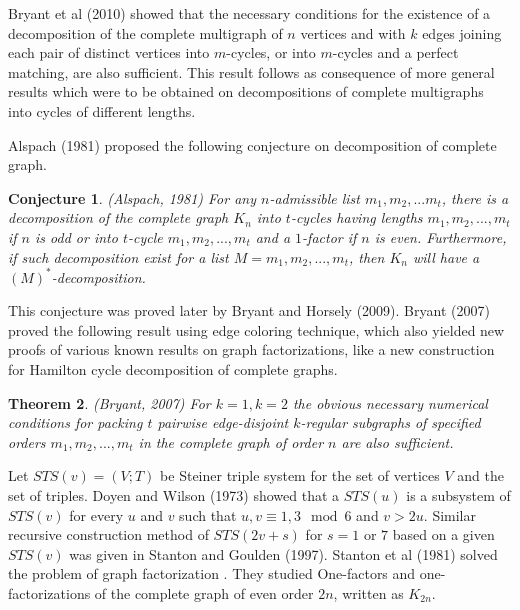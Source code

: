 \documentclass[12pt]{report}
\newtheorem{thm}{Theorem}[section]
\newtheorem{conj}[thm]{Conjecture}
\begin{document}
Bryant et al    (2010) %
showed that the necessary conditions for the existence of a
decomposition of the complete multigraph of $n$ vertices and with
$k$ edges joining each pair of distinct vertices into $m$-cycles, or
into $m$-cycles and a perfect matching, are also sufficient. This
result follows as consequence of more general results which were to
be obtained on decompositions of complete multigraphs into cycles of
different lengths.

Alspach (1981) %
  proposed the following conjecture on decomposition of complete graph.
\begin{conj} (Alspach, 1981) For any $n$-admissible list $m_1,m_2,...m_t$, there is a decomposition of the complete graph $K_n$ into $t$-cycles having lengths $m_1,m_2,...,m_t$ if $n$ is odd or into $t$-cycle $m_1,m_2,...,m_t$ and a $1$-factor if $n$ is even. Furthermore, if such decomposition exist for a list $M=m_1,m_2,...,m_t$, then $K_n$ will have a $(M)^*$-decomposition.
\end{conj}
This conjecture was proved later by Bryant and Horsely (2009).
Bryant (2007) %
proved the following result using edge coloring technique, which
also yielded new proofs of various known results on graph
factorizations, like a new construction for Hamilton cycle
decomposition of complete graphs.
\begin{thm} (Bryant, 2007)
For $k=1,k=2$ the obvious necessary numerical conditions for packing
$t$ pairwise edge-disjoint $k$-regular subgraphs of specified orders
$m_1,m_2,...,m_t$ in the complete graph of order $n$ are also
sufficient.
\end{thm}

Let $STS(v)=(V; T)$ be Steiner triple system  for the set of
vertices $V$ and the set of triples. Doyen and Wilson (1973) showed
that a $STS(u)$ is a subsystem of $STS(v)$ for every $u$ and $v$
such that $u,v \equiv 1,3 \mod 6$ and $v > 2u$. Similar recursive
construction method of $STS(2v + s)$ for $s = 1$ or $7$
based on a given $STS(v)$  was given in Stanton and Goulden (1997). %
Stanton et al  (1981) %
solved the problem of graph factorization . They studied One-factors
and one-factorizations of the complete graph of even order $2n$,
written as $K_{2n}$.
\end{document}
